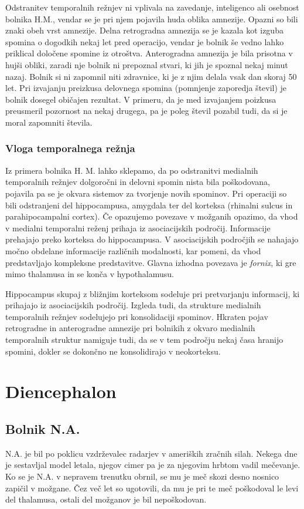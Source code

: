 \documentclass[10pt,a4paper]{article}
\begin{document}
Odstranitev temporalnih režnjev ni vplivala na zavedanje, inteligenco ali osebnost bolnika H.M., vendar se je pri njem pojavila huda oblika amnezije. Opazni so bili znaki obeh vrst amnezije. Delna retrogradna amnezija se je kazala kot izguba spomina o dogodkih nekaj let pred operacijo, vendar je bolnik še vedno lahko priklical določene spomine iz otroštva. Anterogradna amnezija je bila prisotna v hujši obliki, zaradi nje bolnik ni prepoznal stvari, ki jih je spoznal nekaj minut nazaj. Bolnik si ni zapomnil niti zdravnice, ki je z njim delala vsak dan skoraj 50 let. Pri izvajanju preizkusa delovnega spomina (pomnjenje zaporedja števil) je bolnik dosegel običajen rezultat. V primeru, da je med izvajanjem poizkusa preusmeril pozornost na nekaj drugega, pa je poleg števil pozabil tudi, da si je moral zapomniti števila.

\subsubsection{Vloga temporalnega režnja}
Iz primera bolnika H. M. lahko sklepamo, da po odstranitvi medialnih temporalnih režnjev dolgoročni in delovni spomin nista bila poškodovana, pojavila pa se je okvara sistemov za tvorjenje novih spominov. Pri operaciji so bili odstranjeni del hippocampusa, amygdala ter del korteksa (rhinalni sulcus in parahipocampalni cortex). Če opazujemo povezave v možganih opazimo, da vhod v medialni temporalni reženj prihaja iz asociacijskih področij. Informacije prehajajo preko korteksa do hippocampusa. V asociacijskih področjih se nahajajo močno obdelane informacije različnih modalnosti, kar pomeni, da vhod predstavljajo kompleksne predstavitve. Glavna izhodna povezava je {\it fornix}, ki gre mimo thalamusa in se konča v hypothalamusu.

Hippocampus skupaj z bližnjim korteksom sodeluje pri pretvarjanju informacij, ki prihajajo iz asociacijskih področij. Izgleda tudi, da strukture medialnih temporalnih režnjev sodelujejo pri konsolidaciji spominov. Hkraten pojav retrogradne in anterogradne amnezije pri bolnikih z okvaro medialnih temporalnih struktur namiguje tudi, da se v tem področju nekaj časa hranijo spomini, dokler se dokončno ne konsolidirajo v neokorteksu.

\section{Diencephalon}
\subsection{Bolnik N.A.}
N.A. je bil po poklicu vzdrževalec radarjev v ameriških zračnih silah. Nekega dne je sestavljal model letala, njegov cimer pa je za njegovim hrbtom vadil mečevanje. Ko se je N.A. v nepravem trenutku obrnil, se mu je meč skozi desno nosnico zapičil v možgane. Čez več let so ugotovili, da mu je pri te meč poškodoval le levi del thalamusa, ostali del možganov je bil nepoškodovan.
\end{document}
